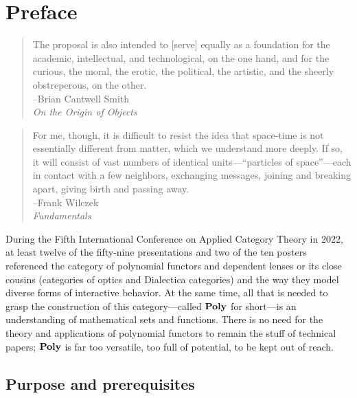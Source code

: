 \documentclass[Book-Poly]{subfiles}
\begin{document}
\chapter*{Preface}\label{chapter.0}

\begin{quote}
	The proposal is also intended to [serve] equally as a foundation for the academic, intellectual, and technological, on the one hand, and for the curious, the moral, the erotic, the political, the artistic, and the sheerly obstreperous, on the other.\\
\mbox{}\hfill --Brian Cantwell Smith\\
\mbox{}\hfill \emph{On the Origin of Objects}
\end{quote}

\begin{quote}
For me, though, it is difficult to resist the idea that space-time is not essentially different from matter, which we understand more deeply. If so, it will consist of vast numbers of identical units---``particles of space''---each in contact with a few neighbors, exchanging messages, joining and breaking apart, giving birth and passing away.\\
\mbox{}\hfill --Frank Wilczek\\
\mbox{}\hfill \emph{Fundamentals}
\end{quote}

During the Fifth International Conference on Applied Category Theory in 2022, at least twelve of the fifty-nine presentations and two of the ten posters referenced the category of polynomial functors and dependent lenses or its close cousins (categories of optics and Dialectica categories) and the way they model diverse forms of interactive behavior.
At the same time, all that is needed to grasp the construction of this category---called $\mathbf{Poly}$ for short---is an understanding of mathematical sets and functions.
There is no need for the theory and applications of polynomial functors to remain the stuff of technical papers; $\mathbf{Poly}$ is far too versatile, too full of potential, to be kept out of reach.

\section*{Purpose and prerequisites}



\end{document}
